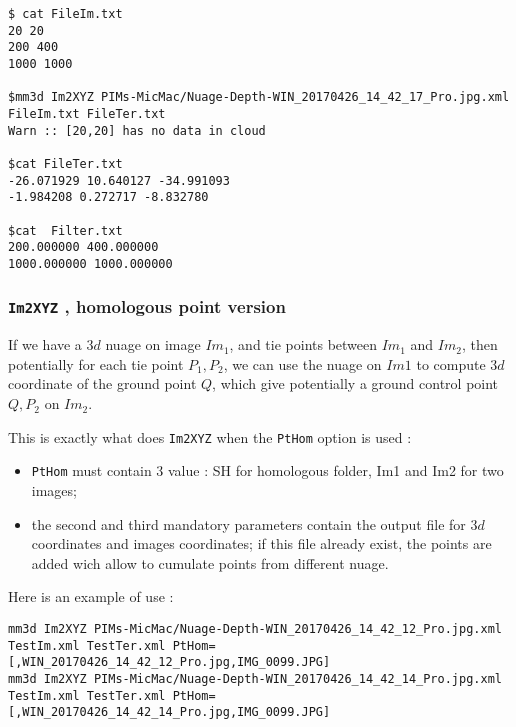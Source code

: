 \begin{verbatim}
$ cat FileIm.txt
20 20
200 400
1000 1000

$mm3d Im2XYZ PIMs-MicMac/Nuage-Depth-WIN_20170426_14_42_17_Pro.jpg.xml FileIm.txt FileTer.txt
Warn :: [20,20] has no data in cloud

$cat FileTer.txt
-26.071929 10.640127 -34.991093
-1.984208 0.272717 -8.832780

$cat  Filter.txt 
200.000000 400.000000
1000.000000 1000.000000
\end{verbatim}


\subsubsection{{\tt Im2XYZ} , homologous point version}

\label{Im2XYZ:Hom}

If we have a $3d$ nuage on image $Im_1$, and tie points between
$Im_1$ and $Im_2$, then potentially for each tie point $P_1,P_2$,
we can use the nuage on $Im1$ to compute $3d$ coordinate of the ground point $Q$, which give
potentially a ground control point $Q,P_2$ on $Im_2$.  

This is exactly what does {\tt Im2XYZ} when the {\tt PtHom} option is used :

\begin{itemize}
    \item {\tt PtHom} must contain 3 value : SH for  homologous folder, Im1 and Im2 for two images;
    \item  the second and third mandatory parameters contain  the output file for $3d$ coordinates
           and images coordinates; if this file already exist, the points are added wich allow
           to cumulate points from different nuage.
\end{itemize}

Here is an example of use :

\begin{verbatim}
mm3d Im2XYZ PIMs-MicMac/Nuage-Depth-WIN_20170426_14_42_12_Pro.jpg.xml TestIm.xml TestTer.xml PtHom=[,WIN_20170426_14_42_12_Pro.jpg,IMG_0099.JPG]
mm3d Im2XYZ PIMs-MicMac/Nuage-Depth-WIN_20170426_14_42_14_Pro.jpg.xml TestIm.xml TestTer.xml PtHom=[,WIN_20170426_14_42_14_Pro.jpg,IMG_0099.JPG]
\end{verbatim}


